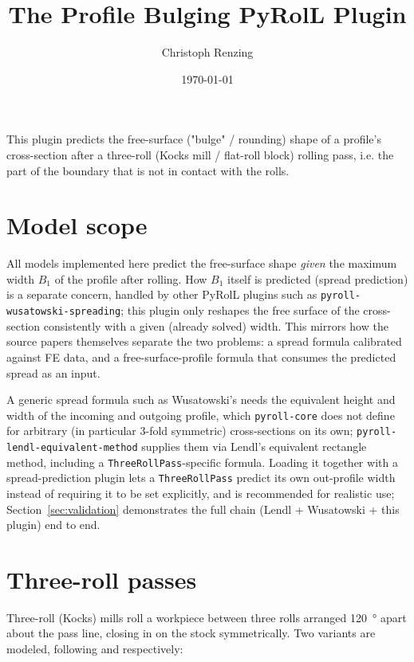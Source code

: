 \documentclass[11pt]{PyRollDocs}
\begin{document}
    \title{The Profile Bulging PyRolL Plugin}
    \author{Christoph Renzing}
    \date{\today}

    \maketitle

    This plugin predicts the free-surface ("bulge" / rounding) shape of a profile's
    cross-section after a three-roll (Kocks mill / flat-roll block) rolling pass, i.e.
    the part of the boundary that is not in contact with the rolls.

    \section{Model scope}\label{sec:model-scope}

    All models implemented here predict the free-surface shape \emph{given} the
    maximum width $B_1$ of the profile after rolling. How $B_1$ itself is predicted
    (spread prediction) is a separate concern, handled by other PyRolL plugins such as
    \texttt{pyroll-wusatowski-spreading}; this plugin only reshapes the free surface of
    the cross-section consistently with a given (already solved) width. This mirrors
    how the source papers themselves separate the two problems: a spread formula
    calibrated against FE data, and a free-surface-profile formula that consumes the
    predicted spread as an input.

    A generic spread formula such as Wusatowski's needs the equivalent height and
    width of the incoming and outgoing profile, which \texttt{pyroll-core} does not
    define for arbitrary (in particular 3-fold symmetric) cross-sections on its own;
    \texttt{pyroll-lendl-equivalent-method} supplies them via Lendl's equivalent
    rectangle method, including a \texttt{ThreeRollPass}-specific formula. Loading it
    together with a spread-prediction plugin lets a \texttt{ThreeRollPass} predict its
    own out-profile width instead of requiring it to be set explicitly, and is
    recommended for realistic use; Section~\ref{sec:validation} demonstrates the full
    chain (Lendl + Wusatowski + this plugin) end to end.

    \section{Three-roll passes}\label{sec:three-roll}

    Three-roll (Kocks) mills roll a workpiece between three rolls arranged \SI{120}{\degree}
    apart about the pass line, closing in on the stock symmetrically. Two variants are
    modeled, following \textcite{min2003} and \textcite{byon2017} respectively:
\end{document}
